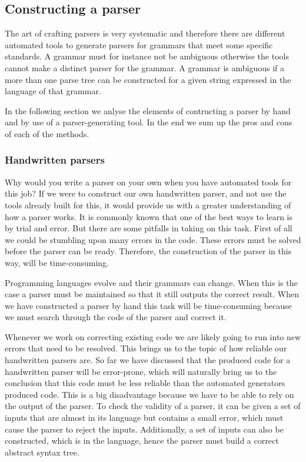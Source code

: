 \subsection{Constructing a parser}
\label{subsec:constructingaparser}
The art of crafting parsers is very systematic and therefore there are different
automated tools to generate parsers for grammars that meet some specific
standards. A grammar must for instance not be ambiguous otherwise the tools
cannot make a distinct parser for the grammar. A grammar is ambiguous if a more
than one parse tree can be constructed for a given string expressed in the
language of that grammar. 

In the following section we anlyse the elements of contructing a parser by hand
and by use of a parser-generating tool. In the end we sum up the pros and cons
of each of the methods. 

\subsubsection{Handwritten parsers}
\label{subsec:handwrittenparsers}
Why would you write a parser on your own when you have automated tools for this
job? If we were to construct our own handwritten parser, and not use the tools
already built for this, it would provide us with a greater understanding of how
a parser works. It is commonly known that one of the best ways to learn is by
trial and error. But there are some pitfalls in taking
on this task. First of all we could be stumbling upon many errors in the code.
These errors must be solved before the parser can be ready. Therefore, the
construction of the parser in this way, will be time-consuming.

Programming languages evolve and their grammars can change. When this is the
case a parser must be maintained so that it still outputs the correct result.
When we have constructed a parser by hand this task will be time-consuming
because we must search through the code of the parser and correct it. 

Whenever we work on correcting existing code we are likely going to run into new
errors that need to be resolved. This brings us to the topic of how reliable our
handwritten parsers are. So far we have discussed that the produced code for a
handwritten parser will be error-prone, which will naturally bring us to the
conclusion that this code must be less reliable than the automated generators
produced code. This is a big disadvantage because we have to be able to rely on
the output of the parser. To check the validity of a parser, it can be given a
set of inputs that are almost in its language but contains a small error, which
must cause the parser to reject the inputs. Additionally, a set of inputs can
also be constructed, which is in the language, hence the parser must build a
correct abstract syntax tree.

